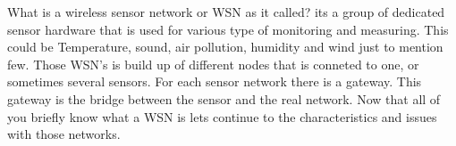 What is  a wireless sensor network or WSN as it called?
its a group of dedicated sensor hardware that is used for various type of monitoring and measuring. This could be Temperature, sound, air pollution, humidity and wind just to mention few. 
Those WSN's is build up of different nodes that is conneted to one, or sometimes several sensors.
For each sensor network there is a gateway. This gateway is the bridge between the sensor and the real network. Now that all of you briefly know  what a WSN is lets continue to the characteristics and issues with those networks.